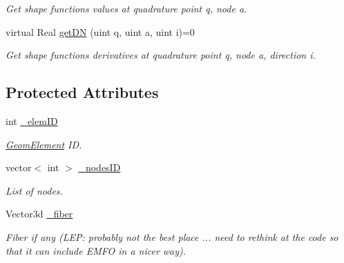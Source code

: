 \begin{DoxyCompactItemize}
\begin{DoxyCompactList}\small\item\em Get shape functions values at quadrature point q, node a. \item\end{DoxyCompactList}\item 
\hypertarget{classvoom_1_1_geom_element_a992248c1ab6844b977eed4f28bc17a63}{
virtual Real \hyperlink{classvoom_1_1_geom_element_a992248c1ab6844b977eed4f28bc17a63}{getDN} (uint q, uint a, uint i)=0}
\label{classvoom_1_1_geom_element_a992248c1ab6844b977eed4f28bc17a63}

\begin{DoxyCompactList}\small\item\em Get shape functions derivatives at quadrature point q, node a, direction i. \item\end{DoxyCompactList}\end{DoxyCompactItemize}
\subsection*{Protected Attributes}
\begin{DoxyCompactItemize}
\item 
\hypertarget{classvoom_1_1_geom_element_abe25de7b2864b04f7979c1bc179bd611}{
int \hyperlink{classvoom_1_1_geom_element_abe25de7b2864b04f7979c1bc179bd611}{\_\-elemID}}
\label{classvoom_1_1_geom_element_abe25de7b2864b04f7979c1bc179bd611}

\begin{DoxyCompactList}\small\item\em \hyperlink{classvoom_1_1_geom_element}{GeomElement} ID. \item\end{DoxyCompactList}\item 
\hypertarget{classvoom_1_1_geom_element_ac45cc5a468feaca2d0a651bfe3def0b5}{
vector$<$ int $>$ \hyperlink{classvoom_1_1_geom_element_ac45cc5a468feaca2d0a651bfe3def0b5}{\_\-nodesID}}
\label{classvoom_1_1_geom_element_ac45cc5a468feaca2d0a651bfe3def0b5}

\begin{DoxyCompactList}\small\item\em List of nodes. \item\end{DoxyCompactList}\item 
\hypertarget{classvoom_1_1_geom_element_a3a959b91ce7d41729d008647eb2cfe35}{
Vector3d \hyperlink{classvoom_1_1_geom_element_a3a959b91ce7d41729d008647eb2cfe35}{\_\-fiber}}
\label{classvoom_1_1_geom_element_a3a959b91ce7d41729d008647eb2cfe35}

\begin{DoxyCompactList}\small\item\em Fiber if any (LEP: probably not the best place ... need to rethink at the code so that it can include EMFO in a nicer way). \item\end{DoxyCompactList}\end{DoxyCompactItemize}


